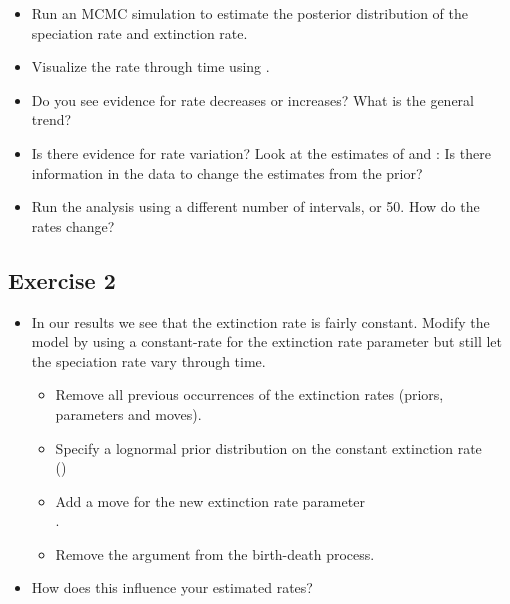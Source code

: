 \begin{itemize}
\item Run an MCMC simulation to estimate the posterior distribution of the speciation rate and extinction rate.
\item Visualize the rate through time using \R.
\item Do you see evidence for rate decreases or increases? What is the general trend?
\item Is there evidence for rate variation? Look at the estimates of  and : Is there information in the data to change the estimates from the prior?
\item Run the analysis using a different number of intervals,  or 50. How do the rates change?
\end{itemize}


\subsection{Exercise 2}

\begin{itemize}
\item In our results we see that the extinction rate is fairly constant. Modify the model by using a constant-rate for the extinction rate parameter but still let the speciation rate vary through time. 
\begin{itemize}
\item Remove all previous occurrences of the extinction rates (\IE priors, parameters and moves).
\item Specify a lognormal prior distribution on the constant extinction rate \\()
\item Add a move for the new extinction rate parameter \\.
\item Remove the argument  from the birth-death process.
\end{itemize}
\item How does this influence your estimated rates?
\end{itemize}





